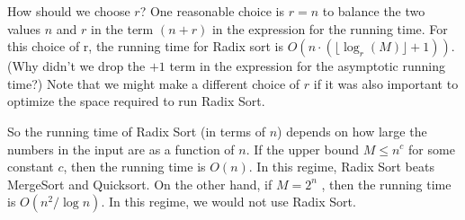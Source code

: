 \documentclass [12pt]{article}
\begin{document}
How should we choose $r$? One reasonable choice is $r = n$ to balance the two values $n$ and $r$ in the term $(n +r)$ in the expression for the running time. For this choice of r, the running time for Radix sort is $O(n \cdot (\lfloor\log_r (M)\rfloor + 1))$. (Why didn’t we drop the $+1$ term in the expression
for the asymptotic running time?) Note that we might make a different choice of $r$ if it was also important to optimize the space required to run Radix Sort.

So the running time of Radix Sort (in terms of $n$) depends on how large the numbers in the input are as a function of $n$. If the upper bound $M \leq n^c$ for some constant $c$, then the running time is $O(n)$. In this regime, Radix Sort beats MergeSort and Quicksort. On the other hand, if $M = 2^n$ , then the running time is $O(n^2/\log n)$. In this regime, we would not use Radix Sort.
\end{document}
